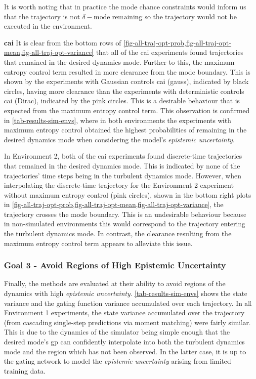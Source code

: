 \documentclass{mimosis-class/mimosis}
\numberwithin{equation}{chapter}
\begin{document}
{It is worth noting that in practice the mode chance constraints would inform us that the trajectory
is not \(\delta-\text{mode remaining}\) so the trajectory would not be executed in the environment.


\newline

\textbf{\acrfull{cai}}
It is clear from the bottom rows of
\cref{fig-all-traj-opt-prob,fig-all-traj-opt-mean,fig-all-traj-opt-variance}
that all of the \acrshort{cai} experiments found trajectories that remained in the desired dynamics mode.
Further to this,
the maximum entropy control term resulted in more clearance from the mode boundary.
This is shown by the experiments with Gaussian controls \acrshort{cai} (gauss), indicated by black circles,
having more clearance than the experiments with deterministic controls \acrshort{cai} (Dirac), indicated by the pink circles.
This is a desirable behaviour that is expected from the maximum entropy control term.
This observation is confirmed in \cref{tab-results-sim-envs}, where in both environments the
experiments with maximum entropy
control obtained the highest probabilities of remaining in the desired dynamics mode when considering the
model's \emph{epistemic uncertainty}.

In Environment 2, both of the \acrshort{cai} experiments
found discrete-time trajectories that remained in the desired dynamics mode.
This is indicated by none of the trajectories' time steps being in the turbulent dynamics mode.
However, when interpolating the discrete-time trajectory for the Environment 2 experiment without
maximum entropy control (pink circles), shown in the bottom right plots in
\cref{fig-all-traj-opt-prob,fig-all-traj-opt-mean,fig-all-traj-opt-variance},
the trajectory crosses the mode boundary.
This is an undesirable behaviour because in non-simulated environments this would correspond to the trajectory
entering the turbulent dynamics mode.
In contrast, the clearance resulting from the maximum entropy control term appears to alleviate this issue.

\subsubsection{Goal 3 - Avoid Regions of High Epistemic Uncertainty}
\label{sec:org3a0cc9d}
Finally, the methods are evaluated at their ability to avoid regions of the dynamics with high \emph{epistemic uncertainty}.
\cref{tab-results-sim-envs} shows the state variance and the gating function variance accumulated over
each trajectory.
In all Environment 1 experiments,
the state variance accumulated over the trajectory (from cascading single-step predictions via moment matching)
were fairly similar.
This is due to the dynamics of the simulator being simple enough that the desired mode's \acrshort{gp}
can confidently interpolate into both the turbulent dynamics mode and the region which has not been observed.
In the latter case, it is up to the gating network to model the \emph{epistemic uncertainty} arising from limited
training data.

}
\end{document}
